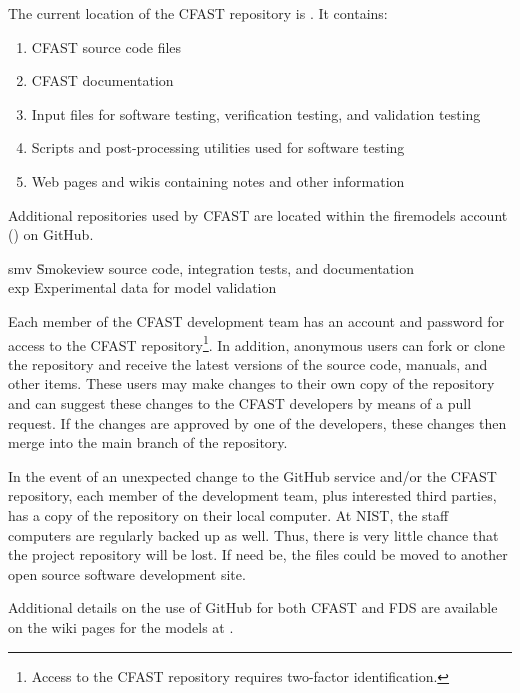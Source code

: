 \documentclass[12pt]{book}
\begin{document}
The current location of the CFAST repository is \href{https://github.com/firemodels/cfast}{}.  It contains:
\begin{enumerate}
    \item CFAST source code files
    \item CFAST documentation
    \item Input files for software testing, verification testing, and validation testing
    \item Scripts and post-processing utilities used for software testing
    \item Web pages and wikis containing notes and other information
\end{enumerate}

Additional repositories used by CFAST are located within the firemodels account  (\href{https://github.com/firemodels/}{}) on GitHub.
\begin{tabbing}
    smv  \hspace{0.5in} \= Smokeview source code, integration tests, and documentation \\
    exp                \> Experimental data for model validation \\
\end{tabbing}

Each member of the CFAST development team has an account and password for access to the CFAST repository\footnote{Access to the CFAST repository requires two-factor identification.}. In addition, anonymous users can fork or clone the repository and receive the latest versions of the source code, manuals, and other items. These users may make changes to their own copy of the repository and can suggest these changes to the CFAST developers by means of a pull request. If the changes are approved by one of the developers, these changes then merge into the main branch of the repository.

In the event of an unexpected change to the GitHub service and/or the CFAST repository, each member of the development team, plus interested third parties, has a copy of the repository on their local computer. At NIST, the staff computers are regularly backed up as well. Thus, there is very little chance that the project repository will be lost. If need be, the files could be moved to another open source software development site.

Additional details on the use of GitHub for both CFAST and FDS are available on the wiki pages for the models at \href{https://github.com/firemodels/fds-smv/wiki}{}.
\end{document}
